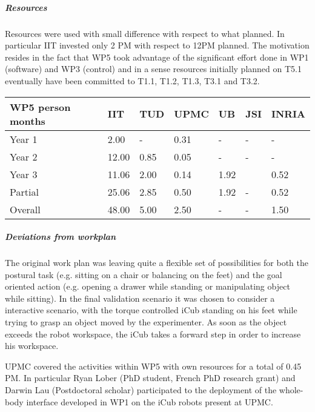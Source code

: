 
\subparagraph*{Resources}

Resources were used with small difference with respect to what planned. In particular IIT invested only 2 PM with respect to 12PM planned. The motivation resides in the fact that WP5 took advantage of the significant effort done in WP1 (software) and WP3 (control) and in a sense resources initially planned on T5.1 eventually have been committed to T1.1, T1.2, T1.3, T3.1 and T3.2.

\begin{center}
\begin{tabular}{|C{1.5cm}|C{1.5cm}|C{1.5cm}|C{2cm}|C{2cm}|C{2cm}|C{2cm}|}
\hline
\footnotesize \textbf{WP5 person months}& \footnotesize \textbf{IIT}&\footnotesize \textbf{TUD}&\footnotesize \textbf{UPMC}& \footnotesize \textbf{UB} &\footnotesize \textbf{JSI} & \footnotesize \textbf{INRIA} \\ \hline
\footnotesize Year 1 &  2.00  & - & 0.31 & - & - & -     \\  \hline
\footnotesize Year 2 &  12.00  & 0.85 & 0.05 & - & - & -     \\  \hline
\footnotesize Year 3 &  11.06 & 2.00 & 0.14 & 1.92 &  & 0.52 \\ \hline
\footnotesize Partial &  25.06 & 2.85 & 0.50 & 1.92 & - & 0.52 \\
\hline \hline
\footnotesize Overall &  48.00 & 5.00 & 2.50 & - & - & 1.50 \\ \hline
\end{tabular}
\end{center}

\subparagraph*{Deviations from workplan} 
The original work plan was leaving quite a flexible set of possibilities for both the postural task (e.g. sitting on a chair or balancing on the feet) and the goal oriented action (e.g. opening a drawer while standing or manipulating object while sitting). In the final validation scenario it was chosen to consider a interactive scenario, with the torque controlled iCub standing on his feet while trying to grasp an object moved by the experimenter. As soon as the object exceeds the robot workspace, the iCub takes a forward step in order to increase his workspace. 

UPMC covered the activities within WP5 with own resources for a total of 0.45 PM. In particular Ryan Lober (PhD student, French PhD research grant) and Darwin Lau (Postdoctoral scholar) participated to the deployment of the whole-body interface developed in WP1 on the iCub robots present at UPMC.
